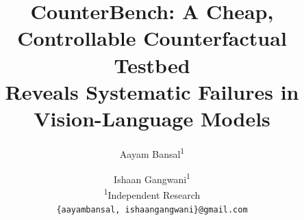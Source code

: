 \documentclass[10pt,twocolumn,letterpaper]{article}
\title{CounterBench: A Cheap, Controllable Counterfactual Testbed\\Reveals Systematic Failures in Vision-Language Models}
\author{Aayam Bansal\textsuperscript{1} \and Ishaan Gangwani\textsuperscript{1}\\
\textsuperscript{1}Independent Research\\
{\tt\small \{aayambansal, ishaangangwani\}@gmail.com}}
\begin{document}
\maketitle









{
    \small
    
    
}
\end{document}
